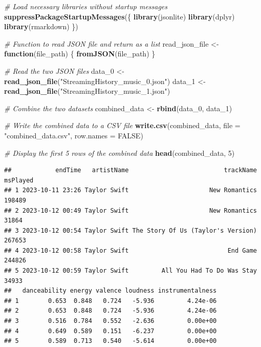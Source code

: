 \documentclass[
]{article}
\newenvironment{Shaded}{\begin{snugshade}}{\end{snugshade}}
\newcommand{\AttributeTok}[1]{\textcolor[rgb]{0.13,0.29,0.53}{#1}}
\newcommand{\CommentTok}[1]{\textcolor[rgb]{0.56,0.35,0.01}{\textit{#1}}}
\newcommand{\ConstantTok}[1]{\textcolor[rgb]{0.56,0.35,0.01}{#1}}
\newcommand{\ControlFlowTok}[1]{\textcolor[rgb]{0.13,0.29,0.53}{\textbf{#1}}}
\newcommand{\DecValTok}[1]{\textcolor[rgb]{0.00,0.00,0.81}{#1}}
\newcommand{\FunctionTok}[1]{\textcolor[rgb]{0.13,0.29,0.53}{\textbf{#1}}}
\newcommand{\NormalTok}[1]{#1}
\newcommand{\OtherTok}[1]{\textcolor[rgb]{0.56,0.35,0.01}{#1}}
\newcommand{\StringTok}[1]{\textcolor[rgb]{0.31,0.60,0.02}{#1}}
\begin{document}
\begin{Shaded}
\begin{Highlighting}[]
\CommentTok{\# Load necessary libraries without startup messages}
\FunctionTok{suppressPackageStartupMessages}\NormalTok{(\{}
  \FunctionTok{library}\NormalTok{(jsonlite)}
  \FunctionTok{library}\NormalTok{(dplyr)}
  \FunctionTok{library}\NormalTok{(rmarkdown)}
\NormalTok{\})}

\CommentTok{\# Function to read JSON file and return as a list}
\NormalTok{read\_json\_file }\OtherTok{\textless{}{-}} \ControlFlowTok{function}\NormalTok{(file\_path) \{}
  \FunctionTok{fromJSON}\NormalTok{(file\_path)}
\NormalTok{\}}

\CommentTok{\# Read the two JSON files}
\NormalTok{data\_0 }\OtherTok{\textless{}{-}} \FunctionTok{read\_json\_file}\NormalTok{(}\StringTok{"StreamingHistory\_music\_0.json"}\NormalTok{)}
\NormalTok{data\_1 }\OtherTok{\textless{}{-}} \FunctionTok{read\_json\_file}\NormalTok{(}\StringTok{"StreamingHistory\_music\_1.json"}\NormalTok{)}

\CommentTok{\# Combine the two datasets}
\NormalTok{combined\_data }\OtherTok{\textless{}{-}} \FunctionTok{rbind}\NormalTok{(data\_0, data\_1)}

\CommentTok{\# Write the combined data to a CSV file}
\FunctionTok{write.csv}\NormalTok{(combined\_data, }\AttributeTok{file =} \StringTok{"combined\_data.csv"}\NormalTok{, }\AttributeTok{row.names =} \ConstantTok{FALSE}\NormalTok{)}

\CommentTok{\# Display the first 5 rows of the combined data}
\FunctionTok{head}\NormalTok{(combined\_data, }\DecValTok{5}\NormalTok{)}
\end{Highlighting}
\end{Shaded}

\begin{verbatim}
##            endTime   artistName                          trackName msPlayed
## 1 2023-10-11 23:26 Taylor Swift                      New Romantics   198489
## 2 2023-10-12 00:49 Taylor Swift                      New Romantics    31864
## 3 2023-10-12 00:54 Taylor Swift The Story Of Us (Taylor's Version)   267653
## 4 2023-10-12 00:58 Taylor Swift                           End Game   244826
## 5 2023-10-12 00:59 Taylor Swift         All You Had To Do Was Stay    34933
##   danceability energy valence loudness instrumentalness
## 1        0.653  0.848   0.724   -5.936         4.24e-06
## 2        0.653  0.848   0.724   -5.936         4.24e-06
## 3        0.516  0.784   0.552   -2.636         0.00e+00
## 4        0.649  0.589   0.151   -6.237         0.00e+00
## 5        0.589  0.713   0.540   -5.614         0.00e+00
\end{verbatim}
\end{document}
